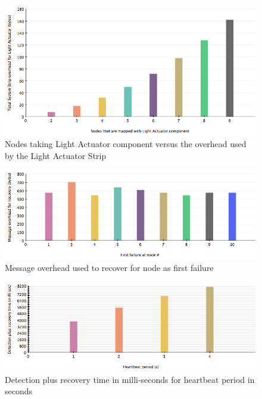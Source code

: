 \begin{figure}[h!]
\centering
    \includegraphics[width=\linewidth]{figures/results-system-overhead-vs-network-size}
\caption{Nodes taking Light Actuator component versus the overhead used by the
Light Actuator Strip}
\label{fig:results-system-overhead-vs-network-size}
\end{figure}

\begin{figure}[h!]
\centering
    \includegraphics[width=\linewidth]{figures/results-message-overhead}
\caption{Message overhead used to recover for node as first failure}
\label{fig:results-message-overhead}
\end{figure}

\begin{figure}[h!]
\centering
    \includegraphics[width=\linewidth]{figures/results-heartbeat-vs-detection-recovery-time}
\caption{Detection plus recovery time in milli-seconds for heartbeat period in seconds}
\label{fig:results-heartbeat-vs-detection-recovery-time}
\end{figure}


